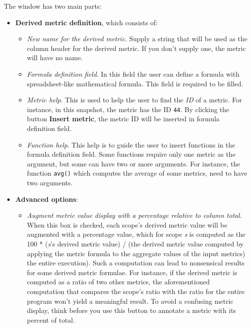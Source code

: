 The window has two main parts:
\begin{itemize}

\item \textbf{Derived metric definition}, which consists of:

\begin{itemize}

\item \textit{New name for the derived metric}.
  Supply a string that will be used as the column header for the derived metric.
  If you don't supply one, the metric will have no name.

\item \textit{Formula definition field}.
  In this field the user can define a formula with spreadsheet-like mathematical formula.
  This field is required to be filled.

\item \textit{Metric help}.
  This is used to help the user to find the \textit{ID} of a metric.
  For instance, in this snapshot, the metric  has the ID \texttt{44}.
  By clicking the button \textbf{Insert metric}, the metric ID will be inserted in formula definition field.

\item \textit{Function help}.
  This help is to guide the user to insert functions in the formula definition field.
  Some functions require only one metric as the argument, but some can have two or more arguments.
  For instance, the function \texttt{avg()} which computes the average of some metrics, need to have two arguments.
\end{itemize}

\item \textbf{Advanced options}:
\begin{itemize}

\item \textit{Augment metric value display with a percentage relative to column total}.
  When this box is checked, each scope's derived metric value will be augmented with a percentage value, which for scope \textit{s} is computed as the 100 * (\textit{s}'s derived metric value) / (the derived metric value computed by applying the metric formula to the aggregate values of the input metrics) the entire execution).
  Such a computation can lead to nonsensical results for some derived metric formulae.
  For instance, if the derived metric is computed as a ratio of two other metrics, the aforementioned computation that compares the scope's ratio with the ratio for the entire program won't yield a meaningful result.
  To avoid a confusing metric display, think before you use this button to annotate a metric with its percent of total.


\end{itemize}
\end{itemize}
